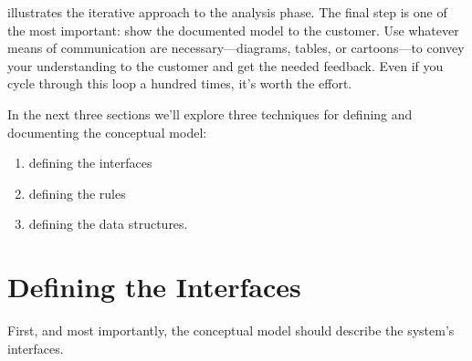  illustrates the iterative approach to the analysis phase.
The final step is one of the most important: show the documented model
to the customer. Use whatever means of communication are
necessary---diagrams, tables, or cartoons---to convey your understanding to
the customer and get the needed feedback. Even if you cycle through this
loop a hundred times, it's worth the effort.


In the next three sections we'll explore three techniques for defining
and documenting the conceptual model:

\begin{enumerate} %
\item defining the interfaces
\item defining the rules
\item defining the data structures.
\end{enumerate}

\section{Defining the Interfaces}

\begin{tip}
First, and most importantly, the conceptual model should describe the
system's interfaces.
\end{tip}

